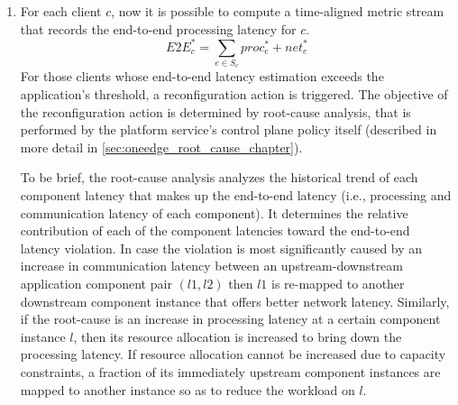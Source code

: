 \begin{enumerate}
\item For each client $c$, now it is possible to compute a time-aligned metric stream that records the end-to-end processing latency for $c$.
\begin{equation}
E2E_c^* = \sum_{e \in S_c} proc_e^* + net_e^*
\end{equation}
For those clients whose end-to-end latency estimation exceeds the application's threshold, a reconfiguration action is triggered. The objective of the reconfiguration action is determined by root-cause analysis, that is performed by the platform service's control plane policy itself (described in more detail in \cref{sec:oneedge_root_cause_chapter}). 
\par To be brief, the root-cause analysis analyzes the historical trend of each component latency that makes up the end-to-end latency (i.e., processing and communication latency of each component). It determines the relative contribution of each of the component latencies toward the end-to-end latency violation. In case the violation is most significantly caused by an increase in communication latency between an upstream-downstream application component pair $\left( l1, l2 \right)$ then $l1$ is re-mapped to another downstream component instance that offers  better network latency. Similarly, if the root-cause is an increase in processing latency at a certain component instance $l$, then its resource allocation is increased to bring down the processing latency. If resource allocation cannot be increased due to capacity constraints, a fraction of its immediately upstream component instances are mapped to another instance so as to reduce the workload on $l$. 
\end{enumerate}

